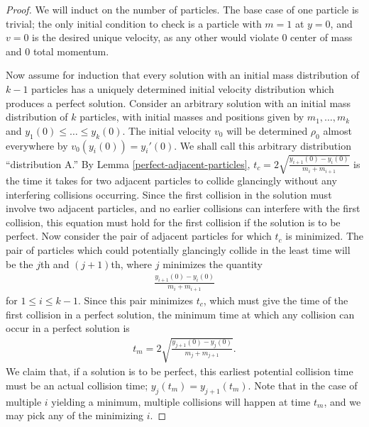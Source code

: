 \documentclass[11pt]{article}
\numberwithin{equation}{section}
\begin{document}
        \begin{proof}
            We will induct on the number of particles. The base case of one particle is trivial; the only initial condition to check is a particle with $m=1$ at $y=0$, and $v=0$ is the desired unique velocity, as any other would violate $0$ center of mass and $0$ total momentum. 

            Now assume for induction that every solution with an initial mass distribution of $k-1$ particles has a uniquely determined initial velocity distribution which produces a perfect solution. Consider an arbitrary solution with an initial mass distribution of $k$ particles, with initial  masses and positions given by $m_1,\ldots, m_k$ and $y_1(0)\leq\ldots\leq y_k(0)$. The initial velocity $v_0$ will be determined $\rho_0$ almost everywhere by $v_0(y_i(0))=y_i'(0)$. We shall call this arbitrary distribution ``distribution A.'' By Lemma \ref{perfect-adjacent-particles}, $t_c=2\sqrt{\frac{y_{i+1}(0)-y_i(0)}{m_i+m_{i+1}}}$ is the time it takes for two adjacent particles to collide glancingly without any interfering collisions occurring. Since the first collision in the solution must involve two adjacent particles, and no earlier collisions can interfere with the first collision, this equation must hold for the first collision if the solution is to be perfect. Now consider the pair of adjacent particles for which $t_c$ is minimized. The pair of particles which could potentially glancingly collide in the least time will be the $j$th and $(j+1)$th, where $j$ minimizes the quantity
            \begin{align*}
                \frac{y_{i+1}(0)-y_i(0)}{m_i+m_{i+1}}
            \end{align*}
            for $1\le i \le k-1$. Since this pair minimizes $t_c$, which must give the time of the first collision in a perfect solution, the minimum time at which any collision can occur in a perfect solution is
            \begin{align*}
                t_m=2\sqrt{\frac{y_{j+1}(0)-y_j(0)}{m_j+m_{j+1}}}.
            \end{align*}
            We claim that, if a solution is to be perfect, this earliest potential collision time must be an actual collision time;  $y_j(t_m)=y_{j+1}(t_m)$. Note that in the case of multiple $i$ yielding a minimum, multiple collisions will happen at time $t_m$, and we may pick any of the minimizing $i$.
            

\end{proof}
\end{document}
